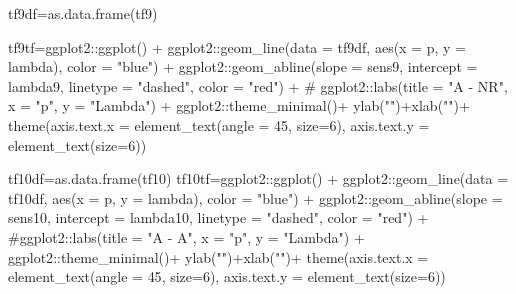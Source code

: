 \documentclass[
  12pt,
  letterpaper,
]{book}
\newenvironment{Shaded}{\begin{snugshade}}{\end{snugshade}}
\newcommand{\AttributeTok}[1]{\textcolor[rgb]{0.40,0.45,0.13}{#1}}
\newcommand{\CommentTok}[1]{\textcolor[rgb]{0.37,0.37,0.37}{#1}}
\newcommand{\DecValTok}[1]{\textcolor[rgb]{0.68,0.00,0.00}{#1}}
\newcommand{\FunctionTok}[1]{\textcolor[rgb]{0.28,0.35,0.67}{#1}}
\newcommand{\NormalTok}[1]{\textcolor[rgb]{0.00,0.23,0.31}{#1}}
\newcommand{\OtherTok}[1]{\textcolor[rgb]{0.00,0.23,0.31}{#1}}
\newcommand{\SpecialCharTok}[1]{\textcolor[rgb]{0.37,0.37,0.37}{#1}}
\newcommand{\StringTok}[1]{\textcolor[rgb]{0.13,0.47,0.30}{#1}}
\begin{document}
\begin{Shaded}
\begin{Highlighting}[]
\NormalTok{tf9df}\OtherTok{=}\FunctionTok{as.data.frame}\NormalTok{(tf9)}

\NormalTok{tf9tf}\OtherTok{=}\NormalTok{ggplot2}\SpecialCharTok{::}\FunctionTok{ggplot}\NormalTok{() }\SpecialCharTok{+}
\NormalTok{  ggplot2}\SpecialCharTok{::}\FunctionTok{geom\_line}\NormalTok{(}\AttributeTok{data =}\NormalTok{ tf9df, }\FunctionTok{aes}\NormalTok{(}\AttributeTok{x =}\NormalTok{ p, }\AttributeTok{y =}\NormalTok{ lambda), }\AttributeTok{color =} \StringTok{"blue"}\NormalTok{) }\SpecialCharTok{+}
\NormalTok{  ggplot2}\SpecialCharTok{::}\FunctionTok{geom\_abline}\NormalTok{(}\AttributeTok{slope =}\NormalTok{ sens9, }\AttributeTok{intercept =}\NormalTok{ lambda9, }\AttributeTok{linetype =} \StringTok{"dashed"}\NormalTok{, }\AttributeTok{color =} \StringTok{"red"}\NormalTok{) }\SpecialCharTok{+}
 \CommentTok{\# ggplot2::labs(title = "A {-} NR", x = "p", y = "Lambda") +}
\NormalTok{  ggplot2}\SpecialCharTok{::}\FunctionTok{theme\_minimal}\NormalTok{()}\SpecialCharTok{+}
  \FunctionTok{ylab}\NormalTok{(}\StringTok{""}\NormalTok{)}\SpecialCharTok{+}\FunctionTok{xlab}\NormalTok{(}\StringTok{""}\NormalTok{)}\SpecialCharTok{+}
  \FunctionTok{theme}\NormalTok{(}\AttributeTok{axis.text.x =} \FunctionTok{element\_text}\NormalTok{(}\AttributeTok{angle =} \DecValTok{45}\NormalTok{, }\AttributeTok{size=}\DecValTok{6}\NormalTok{),}
        \AttributeTok{axis.text.y =} \FunctionTok{element\_text}\NormalTok{(}\AttributeTok{size=}\DecValTok{6}\NormalTok{))}




\NormalTok{tf10df}\OtherTok{=}\FunctionTok{as.data.frame}\NormalTok{(tf10)}
\NormalTok{tf10tf}\OtherTok{=}\NormalTok{ggplot2}\SpecialCharTok{::}\FunctionTok{ggplot}\NormalTok{() }\SpecialCharTok{+}
\NormalTok{  ggplot2}\SpecialCharTok{::}\FunctionTok{geom\_line}\NormalTok{(}\AttributeTok{data =}\NormalTok{ tf10df, }\FunctionTok{aes}\NormalTok{(}\AttributeTok{x =}\NormalTok{ p, }\AttributeTok{y =}\NormalTok{ lambda), }\AttributeTok{color =} \StringTok{"blue"}\NormalTok{) }\SpecialCharTok{+}
\NormalTok{  ggplot2}\SpecialCharTok{::}\FunctionTok{geom\_abline}\NormalTok{(}\AttributeTok{slope =}\NormalTok{ sens10, }\AttributeTok{intercept =}\NormalTok{ lambda10, }\AttributeTok{linetype =} \StringTok{"dashed"}\NormalTok{, }\AttributeTok{color =} \StringTok{"red"}\NormalTok{) }\SpecialCharTok{+}
  \CommentTok{\#ggplot2::labs(title = "A {-} A", x = "p", y = "Lambda") +}
\NormalTok{  ggplot2}\SpecialCharTok{::}\FunctionTok{theme\_minimal}\NormalTok{()}\SpecialCharTok{+}
  \FunctionTok{ylab}\NormalTok{(}\StringTok{""}\NormalTok{)}\SpecialCharTok{+}\FunctionTok{xlab}\NormalTok{(}\StringTok{""}\NormalTok{)}\SpecialCharTok{+}
  \FunctionTok{theme}\NormalTok{(}\AttributeTok{axis.text.x =} \FunctionTok{element\_text}\NormalTok{(}\AttributeTok{angle =} \DecValTok{45}\NormalTok{, }\AttributeTok{size=}\DecValTok{6}\NormalTok{),}
        \AttributeTok{axis.text.y =} \FunctionTok{element\_text}\NormalTok{(}\AttributeTok{size=}\DecValTok{6}\NormalTok{))}
\end{Highlighting}
\end{Shaded}
\end{document}
